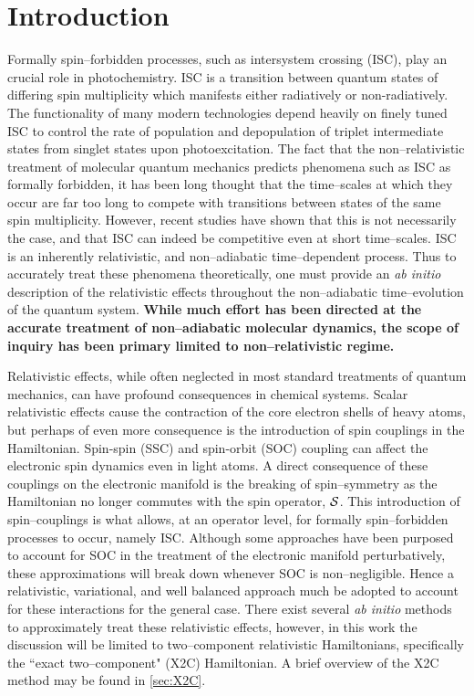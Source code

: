 \section{Introduction}

Formally spin--forbidden processes, such as intersystem crossing (ISC),  play
an crucial role in photochemistry. ISC is a transition between quantum states
of differing spin multiplicity which manifests either radiatively or
non-radiatively.  The functionality of many modern technologies depend heavily
on finely tuned ISC to control the rate of population and depopulation of
triplet intermediate states from singlet states upon photoexcitation. The fact
that the non--relativistic treatment of molecular quantum mechanics predicts
phenomena such as ISC as formally forbidden, it has been long thought that the
time--scales at which they occur are far too long to compete with transitions
between states of the same spin multiplicity. However, recent studies have
shown that this is not necessarily the case, and that ISC can indeed be
competitive even at short time--scales.  ISC is an inherently relativistic, and
non--adiabatic time--dependent process. Thus to accurately treat these phenomena
theoretically, one must provide an \emph{ab initio} description of the
relativistic effects throughout the non--adiabatic time--evolution of the
quantum system.  {\bf While much effort has been directed at the accurate
treatment of non--adiabatic molecular dynamics, the scope of inquiry has been
primary limited to non--relativistic regime.}

Relativistic effects, while often neglected in most standard treatments of
quantum mechanics, can have profound consequences in chemical
systems.\cite{Pyykko12_45} Scalar relativistic effects cause the contraction of
the core electron shells of heavy atoms, but perhaps of even more consequence is
the introduction of spin couplings in the Hamiltonian.  Spin-spin (SSC) and
spin-orbit (SOC) coupling can affect the electronic spin dynamics even in light
atoms. A direct consequence of these couplings on the electronic manifold is the
breaking of spin--symmetry as the Hamiltonian no longer commutes with the spin
operator, $\mathcal{S}$. This introduction of spin--couplings is what allows, at an
operator level, for formally spin--forbidden processes to occur, namely
ISC. Although some approaches have been purposed to account for SOC in the
treatment of the electronic manifold perturbatively\cite{Thiel14_JCP124101},
these approximations will break down whenever SOC is non--negligible. 
Hence a
relativistic, variational, and well balanced approach much be adopted to account
for these interactions for the general case. There exist several \emph{ab
initio} methods to approximately treat these relativistic effects, however, in
this work the discussion will be limited to two--component relativistic
Hamiltonians, specifically the ``exact two--component" (X2C) Hamiltonian. A
brief overview of the X2C method may be found in \cref{sec:X2C}.


